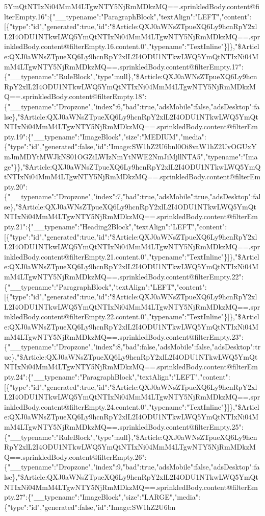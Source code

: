 5YmQtNTIxNi04MmM4LTgwNTY5NjRmMDkzMQ==.sprinkledBody.content@filterEmpty.16":\{"\_\_typename":"ParagraphBlock","textAlign":"LEFT","content":{[}\{"type":"id","generated":true,"id":"\$Article:QXJ0aWNsZTpueXQ6Ly9hcnRpY2xlL2I4ODU1NTkwLWQ5YmQtNTIxNi04MmM4LTgwNTY5NjRmMDkzMQ==.sprinkledBody.content@filterEmpty.16.content.0","typename":"TextInline"\}{]}\},"\$Article:QXJ0aWNsZTpueXQ6Ly9hcnRpY2xlL2I4ODU1NTkwLWQ5YmQtNTIxNi04MmM4LTgwNTY5NjRmMDkzMQ==.sprinkledBody.content@filterEmpty.17":\{"\_\_typename":"RuleBlock","type":null\},"\$Article:QXJ0aWNsZTpueXQ6Ly9hcnRpY2xlL2I4ODU1NTkwLWQ5YmQtNTIxNi04MmM4LTgwNTY5NjRmMDkzMQ==.sprinkledBody.content@filterEmpty.18":\{"\_\_typename":"Dropzone","index":6,"bad":true,"adsMobile":false,"adsDesktop":false\},"\$Article:QXJ0aWNsZTpueXQ6Ly9hcnRpY2xlL2I4ODU1NTkwLWQ5YmQtNTIxNi04MmM4LTgwNTY5NjRmMDkzMQ==.sprinkledBody.content@filterEmpty.19":\{"\_\_typename":"ImageBlock","size":"MEDIUM","media":\{"type":"id","generated":false,"id":"Image:SW1hZ2U6bnl0Oi8vaW1hZ2UvOGUxYmJmMDYtMWJkNS01OGZiLWIzNmYtNWE2NmJiMjllNTA5","typename":"Image"\}\},"\$Article:QXJ0aWNsZTpueXQ6Ly9hcnRpY2xlL2I4ODU1NTkwLWQ5YmQtNTIxNi04MmM4LTgwNTY5NjRmMDkzMQ==.sprinkledBody.content@filterEmpty.20":\{"\_\_typename":"Dropzone","index":7,"bad":true,"adsMobile":true,"adsDesktop":false\},"\$Article:QXJ0aWNsZTpueXQ6Ly9hcnRpY2xlL2I4ODU1NTkwLWQ5YmQtNTIxNi04MmM4LTgwNTY5NjRmMDkzMQ==.sprinkledBody.content@filterEmpty.21":\{"\_\_typename":"Heading2Block","textAlign":"LEFT","content":{[}\{"type":"id","generated":true,"id":"\$Article:QXJ0aWNsZTpueXQ6Ly9hcnRpY2xlL2I4ODU1NTkwLWQ5YmQtNTIxNi04MmM4LTgwNTY5NjRmMDkzMQ==.sprinkledBody.content@filterEmpty.21.content.0","typename":"TextInline"\}{]}\},"\$Article:QXJ0aWNsZTpueXQ6Ly9hcnRpY2xlL2I4ODU1NTkwLWQ5YmQtNTIxNi04MmM4LTgwNTY5NjRmMDkzMQ==.sprinkledBody.content@filterEmpty.22":\{"\_\_typename":"ParagraphBlock","textAlign":"LEFT","content":{[}\{"type":"id","generated":true,"id":"\$Article:QXJ0aWNsZTpueXQ6Ly9hcnRpY2xlL2I4ODU1NTkwLWQ5YmQtNTIxNi04MmM4LTgwNTY5NjRmMDkzMQ==.sprinkledBody.content@filterEmpty.22.content.0","typename":"TextInline"\}{]}\},"\$Article:QXJ0aWNsZTpueXQ6Ly9hcnRpY2xlL2I4ODU1NTkwLWQ5YmQtNTIxNi04MmM4LTgwNTY5NjRmMDkzMQ==.sprinkledBody.content@filterEmpty.23":\{"\_\_typename":"Dropzone","index":8,"bad":false,"adsMobile":false,"adsDesktop":true\},"\$Article:QXJ0aWNsZTpueXQ6Ly9hcnRpY2xlL2I4ODU1NTkwLWQ5YmQtNTIxNi04MmM4LTgwNTY5NjRmMDkzMQ==.sprinkledBody.content@filterEmpty.24":\{"\_\_typename":"ParagraphBlock","textAlign":"LEFT","content":{[}\{"type":"id","generated":true,"id":"\$Article:QXJ0aWNsZTpueXQ6Ly9hcnRpY2xlL2I4ODU1NTkwLWQ5YmQtNTIxNi04MmM4LTgwNTY5NjRmMDkzMQ==.sprinkledBody.content@filterEmpty.24.content.0","typename":"TextInline"\}{]}\},"\$Article:QXJ0aWNsZTpueXQ6Ly9hcnRpY2xlL2I4ODU1NTkwLWQ5YmQtNTIxNi04MmM4LTgwNTY5NjRmMDkzMQ==.sprinkledBody.content@filterEmpty.25":\{"\_\_typename":"RuleBlock","type":null\},"\$Article:QXJ0aWNsZTpueXQ6Ly9hcnRpY2xlL2I4ODU1NTkwLWQ5YmQtNTIxNi04MmM4LTgwNTY5NjRmMDkzMQ==.sprinkledBody.content@filterEmpty.26":\{"\_\_typename":"Dropzone","index":9,"bad":true,"adsMobile":false,"adsDesktop":false\},"\$Article:QXJ0aWNsZTpueXQ6Ly9hcnRpY2xlL2I4ODU1NTkwLWQ5YmQtNTIxNi04MmM4LTgwNTY5NjRmMDkzMQ==.sprinkledBody.content@filterEmpty.27":\{"\_\_typename":"ImageBlock","size":"LARGE","media":\{"type":"id","generated":false,"id":"Image:SW1hZ2U6bn
